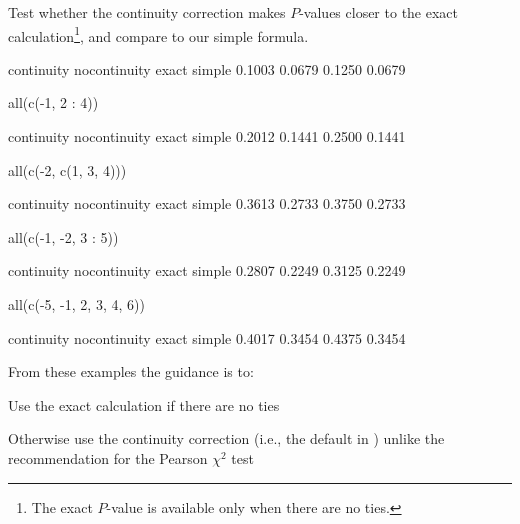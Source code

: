 Test whether the continuity correction makes $P$-values closer to the
exact calculation\footnote{The exact $P$-value is available only when
  there are no ties.}, and compare to our simple formula.
\begin{Schunk}
\begin{Soutput}
  continuity nocontinuity        exact       simple 
      0.1003       0.0679       0.1250       0.0679 
\end{Soutput}
\begin{Sinput}
all(c(-1, 2 : 4))
\end{Sinput}
\begin{Soutput}
  continuity nocontinuity        exact       simple 
      0.2012       0.1441       0.2500       0.1441 
\end{Soutput}
\begin{Sinput}
all(c(-2, c(1, 3, 4)))
\end{Sinput}
\begin{Soutput}
  continuity nocontinuity        exact       simple 
      0.3613       0.2733       0.3750       0.2733 
\end{Soutput}
\begin{Sinput}
all(c(-1, -2, 3 : 5))
\end{Sinput}
\begin{Soutput}
  continuity nocontinuity        exact       simple 
      0.2807       0.2249       0.3125       0.2249 
\end{Soutput}
\begin{Sinput}
all(c(-5, -1, 2, 3, 4, 6))
\end{Sinput}
\begin{Soutput}
  continuity nocontinuity        exact       simple 
      0.4017       0.3454       0.4375       0.3454 
\end{Soutput}
\end{Schunk}
From these examples the guidance is to:
\bi
\item Use the exact calculation if there are no ties
\item Otherwise use the continuity correction (i.e., the default in
  ) unlike the recommendation for the Pearson $\chi^2$ test
\ei


